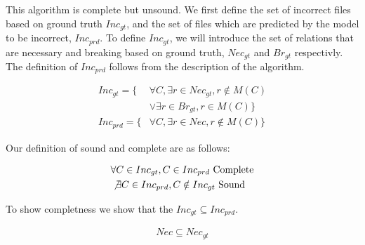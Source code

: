 

This algorithm is complete but unsound.
We first define the set of incorrect files based on ground truth $Inc_{gt}$, and the set of files which are predicted by the model to be incorrect, $Inc_{prd}$.
To define $Inc_{gt}$, we will introduce the set of relations that are necessary and breaking based on ground truth, $Nec_{gt}$ and $Br_{gt}$ respectivly.
The definition of $Inc_{prd}$ follows from the description of the algorithm.

\begin{align}
Inc_{gt} = \{&\forall C, \exists r \in Nec_{gt}, r \notin M(C)\\ \nonumber
 &\lor \exists r \in Br_{gt}, r \in M(C)\} \\
Inc_{prd} = \{&\forall C, \exists r \in Nec, r \notin M(C)\}
\end{align}

Our definition of sound and complete are as follows:

\begin{align}
&\forall C \in Inc_{gt}, C \in Inc_{prd} \text{  Complete} \\
&\not \exists C \in Inc_{prd}, C \notin Inc_{gt} \text{  Sound}
\end{align}

To show completness we show that the $Inc_{gt} \subseteq Inc_{prd}$.

\begin{align*}
Nec \subseteq Nec_{gt}
\end{align*}

